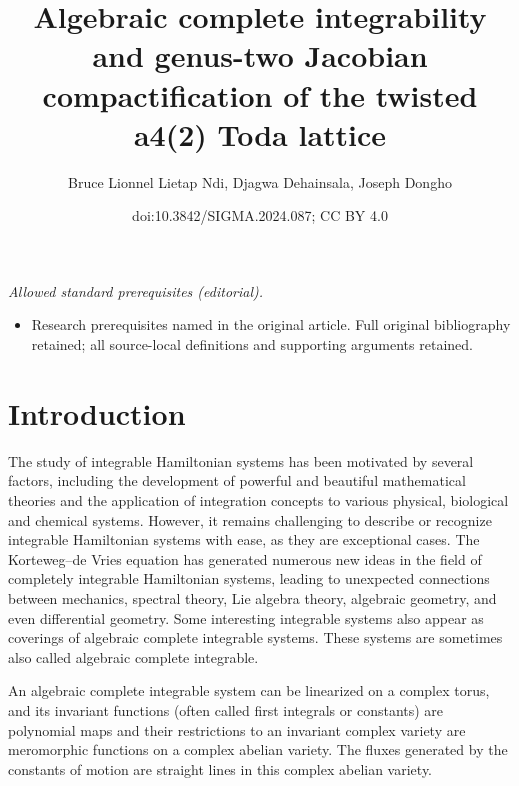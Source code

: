 \documentclass[10pt,a4paper]{amsart}
\title{Algebraic complete integrability and genus-two Jacobian compactification of the twisted a4(2) Toda lattice}
\author{Bruce Lionnel Lietap Ndi, Djagwa Dehainsala, Joseph Dongho}
\date{doi:10.3842/SIGMA.2024.087; CC BY 4.0}
\numberwithin{equation}{section}
\begin{document}
\maketitle
\noindent\textit{Allowed standard prerequisites (editorial).}\begin{itemize}
\item Research prerequisites named in the original article. Full original bibliography retained; all source-local definitions and supporting arguments retained.
\end{itemize}\medskip
\section{Introduction}
The study of integrable Hamiltonian systems has been motivated by
several factors, including the development of powerful and beautiful
mathematical theories and the application of integration concepts to
various physical, biological and chemical systems. However, it
remains challenging to describe or recognize integrable Hamiltonian
systems with ease, as they are exceptional cases. The Korteweg--de Vries
equation has generated numerous new ideas in the field of
completely integrable Hamiltonian systems, leading to unexpected
connections between mechanics, spectral theory, Lie algebra theory,
algebraic geometry, and even differential geometry. Some interesting
integrable systems also appear as coverings of algebraic complete
integrable systems. These systems are sometimes also called
algebraic complete integrable.

 An algebraic complete integrable system can be linearized on a complex torus, and its
invariant functions (often called first integrals or constants) are
polynomial maps and their restrictions to an invariant complex
variety are meromorphic functions on a complex abelian variety. The
fluxes generated by the constants of motion are straight lines in
this complex abelian variety.%
\end{document}
